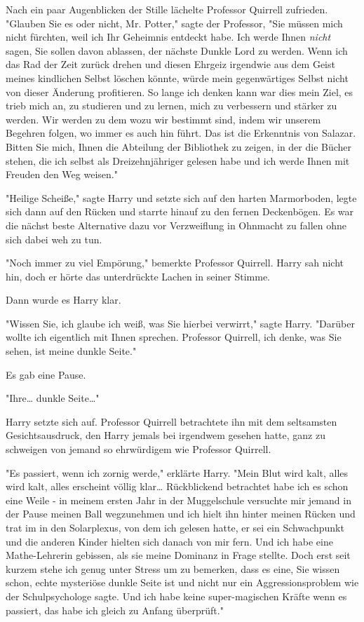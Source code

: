{Nach ein paar Augenblicken der Stille lächelte Professor Quirrell zufrieden. "Glauben Sie es oder nicht, Mr. Potter," sagte der Professor, "Sie müssen mich nicht fürchten, weil ich Ihr Geheimnis entdeckt habe. Ich werde Ihnen \emph{nicht} sagen, Sie sollen davon ablassen, der nächste Dunkle Lord zu werden. Wenn ich das Rad der Zeit zurück drehen und diesen Ehrgeiz irgendwie aus dem Geist meines kindlichen Selbst löschen könnte, würde mein gegenwärtiges Selbst nicht von dieser Änderung profitieren. So lange ich denken kann war dies mein Ziel, es trieb mich an, zu studieren und zu lernen, mich zu verbessern und stärker zu werden. Wir werden zu dem wozu wir bestimmt sind, indem wir unserem Begehren folgen, wo immer es auch hin führt. Das ist die Erkenntnis von Salazar. Bitten Sie mich, Ihnen die Abteilung der Bibliothek zu zeigen, in der die Bücher stehen, die ich selbst als Dreizehnjähriger gelesen habe und ich werde Ihnen mit Freuden den Weg weisen."

"Heilige Scheiße," sagte Harry und setzte sich auf den harten Marmorboden, legte sich dann auf den Rücken und starrte hinauf zu den fernen Deckenbögen. Es war die nächst beste Alternative dazu vor Verzweiflung in Ohnmacht zu fallen ohne sich dabei weh zu tun.

"Noch immer zu viel Empörung," bemerkte Professor Quirrell. Harry sah nicht hin, doch er hörte das unterdrückte Lachen in seiner Stimme.

Dann wurde es Harry klar.

"Wissen Sie, ich glaube ich weiß, was Sie hierbei verwirrt," sagte Harry. "Darüber wollte ich eigentlich mit Ihnen sprechen. Professor Quirrell, ich denke, was Sie sehen, ist meine dunkle Seite."

Es gab eine Pause.

"Ihre… dunkle Seite…"

Harry setzte sich auf. Professor Quirrell betrachtete ihn mit dem seltsamsten Gesichtsausdruck, den Harry jemals bei irgendwem gesehen hatte, ganz zu schweigen von jemand so ehrwürdigem wie Professor Quirrell.

"Es passiert, wenn ich zornig werde," erklärte Harry. "Mein Blut wird kalt, alles wird kalt, alles erscheint völlig klar… Rückblickend betrachtet habe ich es schon eine Weile - in meinem ersten Jahr in der Muggelschule versuchte mir jemand in der Pause meinen Ball wegzunehmen und ich hielt ihn hinter meinen Rücken und trat im in den Solarplexus, von dem ich gelesen hatte, er sei ein Schwachpunkt und die anderen Kinder hielten sich danach von mir fern. Und ich habe eine Mathe-Lehrerin gebissen, als sie meine Dominanz in Frage stellte. Doch erst seit kurzem stehe ich genug unter Stress um zu bemerken, dass es eine, Sie wissen schon, echte mysteriöse dunkle Seite ist und nicht nur ein Aggressionsproblem wie der Schulpsychologe sagte. Und ich habe keine super-magischen Kräfte wenn es passiert, das habe ich gleich zu Anfang überprüft."

}
